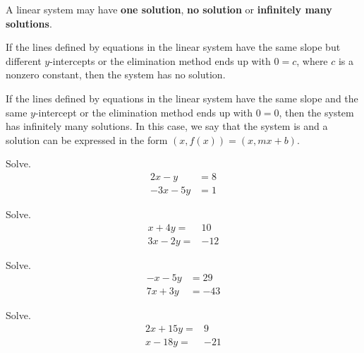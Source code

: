	
	\begin{note}
		A linear system may have \textbf{one solution}, \textbf{no solution} or \textbf{infinitely many solutions}.
	

	If the lines defined by equations in the linear system have the same slope but different $y$-intercepts or the elimination method ends up with $0=c$, where $c$ is a nonzero constant, then the system has no solution.

	If the lines defined by equations in the linear system have the same slope and the same $y$-intercept or the elimination method ends up with $0=0$, then the system has infinitely many solutions. In this case, we say that the system is  and a solution can be expressed in the form $(x, f(x))=(x, mx+b)$.
\end{note}






\newpage





\begin{multicols}{2}
	\begin{exercise}
		Solve.
		\begin{align*}
			2x-y   & =8 \\
			-3x-5y & =1
		\end{align*}
	\end{exercise}


	\begin{exercise}
		Solve.
		\begin{align*}
			x+4y=  & 10  \\
			3x-2y= & -12
		\end{align*}
	\end{exercise}
\end{multicols}

\vfill
\begin{center}
	\hfill
\end{center}

\begin{multicols}{2}
	\begin{exercise}
		Solve.
		\begin{align*}
			-x-5y & =29  \\
			7x+3y & =-43
		\end{align*}
	\end{exercise}


	\begin{exercise}
		Solve.
		\begin{align*}
			2x+15y= & 9   \\
			x-18y=  & -21
		\end{align*}
	\end{exercise}
\end{multicols}

